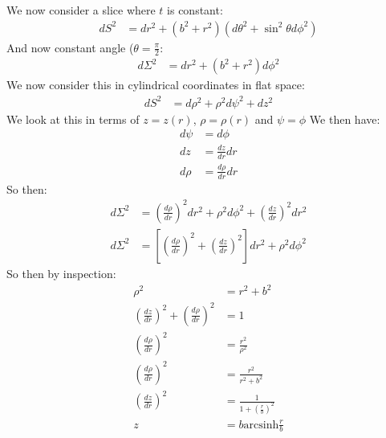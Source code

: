 We now consider a slice where $t$ is constant:
\begin{align*}
	dS^2 &= dr^2 +(b^2 + r^2)(d\theta^2 + \sin^2\theta d\phi^2)
\end{align*}
And now constant angle ($\theta = \frac{\pi}{2}$:
\begin{align*}
	d\Sigma^2 &= dr^2 +(b^2 + r^2)d\phi^2
\end{align*}
We now consider this in cylindrical coordinates in flat space:
\begin{align*}
	dS^2 &= d\rho^2 + \rho^2 d\psi^2 + dz^2
\end{align*}
We look at this in terms of $z= z(r)$, $\rho = \rho(r)$ and $\psi = \phi$
We then have:
\begin{align*}
	d\psi &= d\phi \\
	dz &= \frac{dz}{dr} dr \\
	d\rho &= \frac{d\rho}{dr} dr
\end{align*}
So then:
\begin{align*}
	d\Sigma^2 &= \left(\frac{d\rho}{dr}\right)^2 dr^2 + \rho^2d\phi^2 + \left(\frac{dz}{dr}\right)^2 dr^2 \\
	d\Sigma^2 &= \left[\left(\frac{d\rho}{dr}\right)^2+ \left(\frac{dz}{dr}\right)^2 \right] dr^2 + \rho^2d\phi^2
\end{align*}
So then by inspection:
\begin{align*}
	\rho^2 &= r^2 + b^2 \\
	\left(\frac{dz}{dr}\right)^2 + \left(\frac{d\rho}{dr}\right)^2 &= 1 \\
	\left(\frac{d\rho}{dr}\right)^2 &= \frac{r^2}{\rho^2} \\
	\left(\frac{d\rho}{dr}\right)^2 &= \frac{r^2}{r^2 + b^2} \\
	\left(\frac{dz}{dr}\right)^2 &= \frac{1}{1 + \left(\frac{r}{b}\right)^2} \\
	z &= b\text{arcsinh}\frac{r}{b}
\end{align*}
